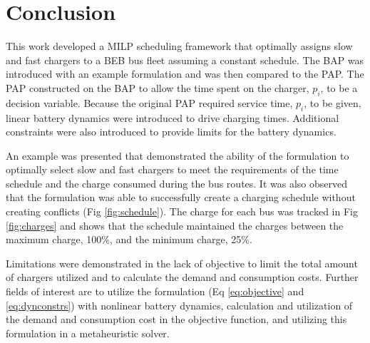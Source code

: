 \documentclass[letterpaper, 10pt, conference]{IEEEtran}
\begin{document}
\section{Conclusion}
\label{sec:conclusion}
This work developed a MILP scheduling framework that optimally assigns slow and fast chargers to a BEB bus fleet
assuming a constant schedule. The BAP was introduced with an example formulation and was then compared to the PAP. The
PAP constructed on the BAP to allow the time spent on the charger, $p_i$, to be a decision variable. Because the
original PAP required service time, $p_i$, to be given, linear battery dynamics were introduced to drive charging times.
Additional constraints were also introduced to provide limits for the battery dynamics.

An example was presented that demonstrated the ability of the formulation to optimally select slow and fast chargers to
meet the requirements of the time schedule and the charge consumed during the bus routes. It was also observed that the
formulation was able to successfully create a charging schedule without creating conflicts (Fig \ref{fig:schedule}). The
charge for each bus was tracked in Fig \ref{fig:charges} and shows that the schedule maintained the charges between the
maximum charge, 100\%, and the minimum charge, 25\%.

Limitations were demonstrated in the lack of objective to limit the total amount of chargers utilized and to calculate
the demand and consumption costs. Further fields of interest are to utilize the formulation (Eq \eqref{eq:objective} and
\eqref{eq:dynconstrs}) with nonlinear battery dynamics, calculation and utilization of the demand and consumption cost
in the objective function, and utilizing this formulation in a metaheuristic solver.




\end{document}
